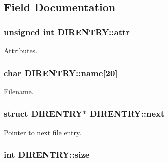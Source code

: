 \subsection{Field Documentation}
\hypertarget{structDIRENTRY_a3a69fa9a11d915150af5a10047f593da}{}
\subsubsection[{attr}]{\setlength{\rightskip}{0pt plus 5cm}unsigned int D\+I\+R\+E\+N\+T\+R\+Y\+::attr}\label{structDIRENTRY_a3a69fa9a11d915150af5a10047f593da}


Attributes. 

\hypertarget{structDIRENTRY_a399cf9bfdcc24e250a0276eea0ae95c0}{}
\subsubsection[{name}]{\setlength{\rightskip}{0pt plus 5cm}char D\+I\+R\+E\+N\+T\+R\+Y\+::name\mbox{[}20\mbox{]}}\label{structDIRENTRY_a399cf9bfdcc24e250a0276eea0ae95c0}


Filename. 

\hypertarget{structDIRENTRY_aa137960e22f2663b42d51cb6979f3ac3}{}
\subsubsection[{next}]{\setlength{\rightskip}{0pt plus 5cm}struct {\bf D\+I\+R\+E\+N\+T\+R\+Y}$\ast$ D\+I\+R\+E\+N\+T\+R\+Y\+::next}\label{structDIRENTRY_aa137960e22f2663b42d51cb6979f3ac3}


Pointer to next file entry. 

\hypertarget{structDIRENTRY_a5c334817f6e1341cd2c0e69a3eea867b}{}
\subsubsection[{size}]{\setlength{\rightskip}{0pt plus 5cm}int D\+I\+R\+E\+N\+T\+R\+Y\+::size}\label{structDIRENTRY_a5c334817f6e1341cd2c0e69a3eea867b}



